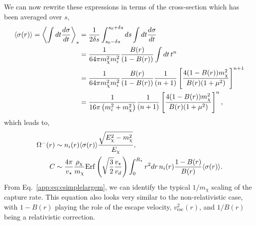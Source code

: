 We can now rewrite these expressions in terms of the cross-section which has been averaged over $s$, 
\begin{align}
\langle\sigma(r)\rangle=\left\langle\int dt \frac{d\sigma}{dt} \right\rangle_s &= \frac{1}{2\delta s}\int_{s_0-\delta s}^{s_0+\delta s} ds \int dt \frac{d\sigma}{dt} \\
& = \frac{1}{64\pi m_\chi^2 m_i^2} \frac{B(r)}{(1-B(r))}   \int dt \, t^n \\
&= \frac{1}{64\pi m_\chi^2 m_i^2} \frac{B(r)}{(1-B(r))} \frac{1}{(n+1)} \left[\frac{4(1-B(r))m_\chi^2}{B(r)(1+\mu^2)}\right]^{n+1}\\
&= \frac{1}{16\pi \left(m_i^2+m_\chi^2\right)}  \frac{1}{(n+1)} \left[\frac{4(1-B(r))m_\chi^2}{B(r)(1+\mu^2)}\right]^{n}, 
\end{align}
which leads to, 
\begin{align}
\Omega^{-}(r) &\sim n_i(r) \langle\sigma(r)\rangle \frac{\sqrt{E_\chi^2-m_\chi^2}}{E_\chi}, \\
C &\sim \frac{4\pi}{v_\star} \frac{\rho_\chi}{m_\chi}  {\rm Erf}\left(\sqrt{\frac{3}{2}}\frac{v_\star}{v_d}\right)\int_0^{R_\star}  r^2 dr \, n_i(r)  \frac{1-B(r)}{B(r)} \langle\sigma(r)\rangle\label{app:eq:csimplelargem}. 
\end{align}
From Eq.~\ref{app:eq:csimplelargem}, we can identify the typical $1/m_\chi$ scaling of the capture rate. This equation also looks very similar to the non-relativistic case, with $1-B(r)$ playing the role of the escape velocity, $v_\mathrm{esc}^2(r)$, and $1/B(r)$ being a relativistic correction.

